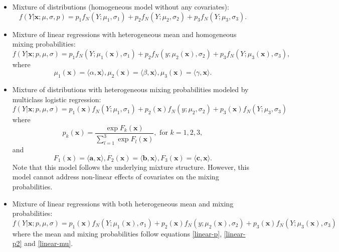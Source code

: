 \documentclass[11pt]{article}
\numberwithin{equation}{section}
\def\bx{\boldsymbol{x}}
\begin{document}
\begin{itemize}
	\item 	Mixture of distributions (homogeneous model without any covariates):
	\begin{equation}\label{gaussian-0}
		f(Y|\bx;\mu,\sigma,p)=p_1f_N(Y;\mu_1,\sigma_1)+p_2f_N(Y;\mu_2,\sigma_2)+p_3f_N(Y;\mu_3,\sigma_3).
	\end{equation}

	\item 	Mixture of linear regressions with heterogeneous mean and homogeneous mixing probabilities:
\begin{equation}\label{gaussian-glm-mu}
	f(Y|\bx;p,\mu,\sigma)=p_1f_N(Y;\mu_1(\bx),\sigma_1)+p_2f_N(y;\mu_2(\bx),\sigma_2)+p_3f_N(Y;\mu_3(\bx),\sigma_3),
\end{equation}
where
\begin{equation}\label{linear-mu}
	\mu_1(\bx)=\langle\alpha,\bx\rangle, \mu_2(\bx)=\langle\beta,\bx\rangle,\mu_3(\bx)=\langle\gamma,\bx\rangle.
\end{equation}

\item 	Mixture of distributions with heterogeneous mixing probabilities modeled by multiclass logistic regression:
\begin{equation}\label{gaussian-glm-p}
	f(Y|\bx;p,\mu,\sigma)=p_1(\bx)f_N(Y;\mu_1,\sigma_1)+p_2(\bx)f_N(y;\mu_2,\sigma_2)+p_3(\bx)f_N(Y;\mu_3,\sigma_3)
\end{equation}
where
\begin{equation}\label{linear-p}
	p_k(\bx)=\frac{\exp{F_k(\bx)}}{\sum_{l=1}^{3}\exp{F_l(\bx)}}, \text{ for } k=1,2,3,
\end{equation}
and 
\begin{equation}\label{linear-p2}
	F_1(\bx)=\langle \boldsymbol{a},\bx\rangle, F_2(\bx)=\langle \boldsymbol{b},\bx\rangle,F_3(\bx)=\langle \boldsymbol{c},\bx\rangle.
\end{equation}
Note that this model follows the underlying mixture structure. However, this model cannot address non-linear effects of covariates on the mixing probabilities.

	\item 	Mixture of linear regressions with both heterogeneous mean and mixing probabilities:
	\begin{equation}\label{gaussian-glm-b}
		f(Y|\bx;p,\mu,\sigma)=p_1(\bx)f_N(Y;\mu_1(\bx),\sigma_1)+p_2(\bx)f_N(y;\mu_2(\bx),\sigma_2)+p_3(\bx)f_N(Y;\mu_3(\bx),\sigma_3)
	\end{equation}
where the mean and mixing probabilities follow equations \eqref{linear-p}, \eqref{linear-p2} and \eqref{linear-mu}.




\end{itemize}
\end{document}
